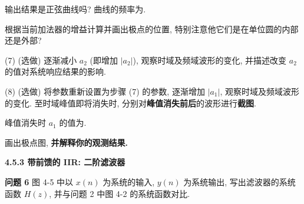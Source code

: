 \documentclass{dspreport}
\begin{document}
输出结果是正弦曲线吗? 曲线的频率为\underline{\blank{  }}.

\begin{block}

\end{block}

根据当前加法器的增益计算并画出极点的位置, 特别注意他它们是在单位圆的内部还是外部?

\begin{block}

\end{block}

(7) {\color{red} (选做)} 逐渐减小 $a_2$ (即增加 $|a_2|$), 观察时域及频域波形的变化, 并描述改变 $a_2$ 的值对系统响应结果的影响.

\begin{block}

\end{block}

(8) {\color{red} (选做)} 将参数重新设置为步骤 (7) 的参数, 逐渐增加 $|a_1|$, 观察时域及频域波形的变化. 至时域峰值即将消失时, 分别对\textbf{峰值消失前后}的波形进行\textbf{截图}.

\begin{block}

\end{block}

\begin{figure}[H]

\end{figure}

\begin{block}

\end{block}

\noindent 峰值消失时 $a_1$ 的值为\underline{\blank{  }}.

\noindent 画出极点图, \textbf{并解释你的观测结果.}

\begin{block}

\end{block}

\begin{figure}[H]

\end{figure}

\begin{block}

\end{block}

\noindent\textbf{4.5.3 带前馈的 IIR: 二阶滤波器}

\textbf{问题 6} 图 4-5 中以 $x(n)$ 为系统的输入, $y(n)$ 为系统输出, 写出滤波器的系统函数 $H(z)$, 并与问题 2 中图 4-2 的系统函数对比.
\end{document}
